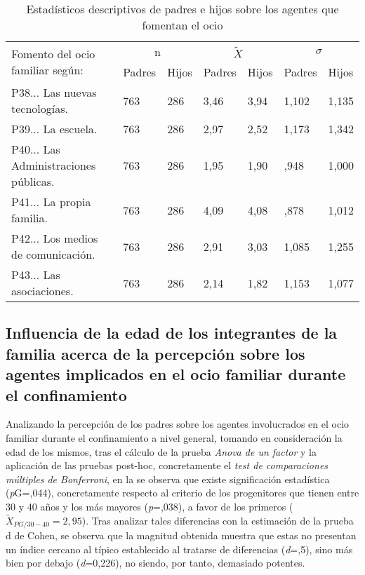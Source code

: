 \documentclass[spanish]{textolivre}
\begin{document}
\begin{table}[htpb]
\caption{Estadísticos descriptivos de padres e hijos sobre los agentes que fomentan el ocio}
\label{tab2}
\centering
\begin{tabular}{lllllll}
\toprule
\multirow{2}{*}{Fomento del ocio familiar según:} & \multicolumn{2}{c}{n} & \multicolumn{2}{c}{$\tilde{X}$} & \multicolumn{2}{c}{\begin{math}\sigma\end{math}}
\\
& Padres & Hijos & Padres & Hijos & Padres & Hijos
\\
\midrule
P38... Las nuevas tecnologías. & 763 & 286 & 3,46 & 3,94 & 1,102 & 1,135
\\
P39... La escuela. & 763 & 286 & 2,97 & 2,52 & 1,173 & 1,342
\\
P40... Las Administraciones públicas. & 763 & 286 & 1,95 & 1,90 & ,948 & 1,000
\\
P41... La propia familia. & 763 & 286 & 4,09 & 4,08 & ,878 & 1,012
\\
P42... Los medios de comunicación. & 763 & 286 & 2,91 & 3,03 & 1,085 & 1,255
\\
P43... Las asociaciones. & 763 & 286 & 2,14 & 1,82 & 1,153 & 1,077
\\
\bottomrule
\end{tabular}
\centering
{}
\end{table}

\subsection{Influencia de la edad de los integrantes de la familia acerca de la percepción sobre los agentes implicados en el ocio familiar durante el confinamiento}
Analizando la percepción de los padres sobre los agentes involucrados en el ocio familiar durante el confinamiento a nivel general, tomando en consideración la edad de los mismos, tras el cálculo de la prueba \emph{Anova de un factor} y la aplicación de las pruebas post-hoc, concretamente el \emph{test de comparaciones múltiples de Bonferroni}, en la  se observa que existe significación estadística (\emph{p}G=,044), concretamente respecto al criterio de los progenitores que tienen entre 30 y 40 años y los más mayores (\emph{p}=,038), a favor de los primeros ($\tilde{X}_{PG/30-40}=2,95$). Tras analizar tales diferencias con la estimación de la prueba d de Cohen, se observa que la magnitud obtenida muestra que estas no presentan un índice cercano al típico establecido al tratarse de diferencias (\emph{d}=,5), sino más bien por debajo (\emph{d}=0,226), no siendo, por tanto, demasiado potentes. 
\end{document}
